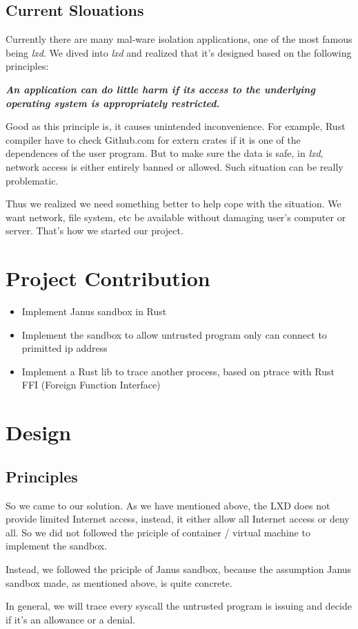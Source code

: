 \documentclass[conference,compsoc]{IEEEtran}
\begin{document}
	\subsection{Current Slouations}
		\par
			Currently there are many mal-ware isolation applications, one of the most famous being \emph{lxd}. 
			We dived into \emph{lxd} and realized that it's designed based on the following principles:
		\par
			\emph{\textbf{
				An application can do little harm if its access to the underlying operating system is appropriately restricted.\cite{SecSandBox}
			}}
		\par
			Good as this principle is, it causes unintended inconvenience. 
			For example, Rust compiler have to check Github.com for extern crates if it is one of the dependences of the user program. 
			But to make sure the data is safe, in \emph{lxd}, network access is either entirely banned or allowed.
			Such situation can be really problematic.
		\par
			Thus we realized we need something better to help cope with the situation. 
			We want network, file system, etc be available without damaging user's computer or server. 
			That's how we started our project.
\section {Project Contribution}
\begin{itemize}
	\item{Implement Janus sandbox in Rust}
	\item{Implement the sandbox to allow untrusted program only can connect to primitted ip address}
	\item{Implement a Rust lib to trace another process, based on ptrace with Rust FFI (Foreign Function Interface)}
\end{itemize}
\section {Design}
	\subsection{Principles}
		\par
			So we came to our solution. As we have mentioned above, the LXD does not provide limited Internet access, instead, it either allow all Internet access or deny all. So we did not followed the priciple of container / virtual machine to implement the sandbox.
			\par
			Instead, we followed the priciple of Janus sandbox, because the assumption Janus sandbox made, as mentioned above, is quite concrete.
			\par
			In general, we will trace every syscall the untrusted program is issuing and decide if it's an allowance or a denial.
\end{document}
